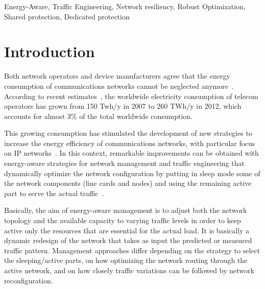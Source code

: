 \documentclass[final,5p,times,twocolumn]{elsarticle}
\begin{document}
\begin{frontmatter}
\begin{abstract}
\end{abstract}

\begin{keyword}
Energy-Aware, Traffic Engineering, Network resiliency, Robust Optimization, Shared protection, Dedicated protection
\end{keyword}

\end{frontmatter}

\section{Introduction}\label{sec:introduction}


Both network operators and device manufacturers agree that the energy consumption of communications networks cannot be neglected anymore~\cite{greentouch}. According to recent estimates~\cite{lambert12}, the worldwide electricity consumption of telecom operators has grown from 150 Twh/y in 2007  to 260 TWh/y in 2012, which accounts for almost 3\% of the total worldwide consumption. 

This growing consumption has stimulated the 
development of new strategies to increase the energy efficiency of communications networks,
with particular focus on IP networks~\cite{mellah09,bolla11,vetter12}.
In this context, remarkable improvements can be obtained with energy-aware strategies for network management and traffic engineering that dynamically optimize the network configuration by putting in sleep mode some of the network components (line cards and nodes) and using the remaining active part to serve the actual traffic~\cite{amaldi13,chabarek08,mahadevan09,bianzino12c,bolla11,zeadally11}.

Basically, the aim of energy-aware management is to adjust both the network topology and the available capacity to varying traffic levels in order to keep active only the resources that are essential for the actual load. It is basically a dynamic redesign of the network that takes as input the predicted or measured traffic pattern. Management approaches differ depending on the strategy to select the sleeping/active parts, on how optimizing the network routing through the active network, and on how closely traffic variations can be followed by network reconfiguration.
\end{document}
